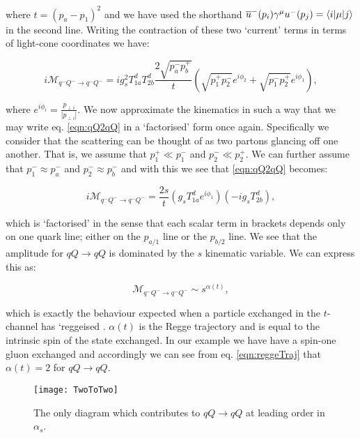 		where $t = (p_a - p_1)^2$ and we have used the shorthand $\overline{u}^-(p_i)\gamma^\mu u^-(p_j) = \langle i | \mu | j \rangle$ in the second line.
		Writing the contraction of these two `current' terms in terms of light-cone coordinates we have:

		\begin{equation}
			i\mathcal{M}_{q^-Q^-\rightarrow q^-Q^-} = ig_s^2T^d_{1a}T^d_{2b}\frac{2\sqrt{p_a^-p_b^+}}{t}
			\left(\sqrt{p_1^+p_2^-}e^{i\phi_2} + \sqrt{p_1^-p_2^+}e^{i\phi_1}\right),
			\label{eqn:qQ2qQ}
		\end{equation}

		where $e^{i\phi_i} = \frac{p_{\perp i}}{|p_{\perp i}|}$.  We now approximate the kinematics in such a way that we may write
		eq. \eqref{eqn:qQ2qQ} in a `factorised' form once again.  Specifically we consider that the scattering can be thought
		of as two partons glancing off one another.  That is, we assume that $p_1^+\ll p_1^-$ and $p_2^-\ll p_2^+$.  We can further
		assume that $p_1^-\approx p_a^-$ and $p_2^-\approx p_b^-$ and with this we see that \eqref{eqn:qQ2qQ} becomes:

		\begin{equation}
			i\mathcal{M}_{q^-Q^-\rightarrow q^-Q^-} = \frac{2s}{t}\left(g_sT^d_{1a}e^{i\phi_1}\right)\left(-ig_sT^d_{2b}\right),
			\label{eqn:reggeTraj}
		\end{equation}

		which is `factorised' in the sense that each scalar term in brackets depends only on one quark line; either on the $p_{a/1}$
		line or the $p_{b/2}$ line.  We see that the amplitude for $qQ\rightarrow qQ$ is dominated by the $s$ kinematic variable.
		We can express this as:

		\begin{equation}
			\mathcal{M}_{q^-Q^-\rightarrow q^-Q^-} \sim s^{\alpha(t)},
		\end{equation}

		which is exactly the behaviour expected when a particle exchanged in the $t$-channel has `reggeised
		\cite{sabioThesis,DelDuca:1995hf,lipatovBook}.  $\alpha(t)$ is the Regge trajectory and is equal to
		the intrinsic spin of the state exchanged.  In our example we have have a spin-one gluon exchanged
		and accordingly we can see from eq. \eqref{eqn:reggeTraj} that $\alpha(t)=2$ for $qQ\rightarrow qQ$.

		\begin{figure}
			\begin{center}
			\texttt{[image: TwoToTwo]}
			\caption{The only diagram which contributes to $qQ\rightarrow qQ$ at leading order in $\alpha_s$.}
			\label{fig:TwoToTwo}
			\end{center}
		\end{figure}

